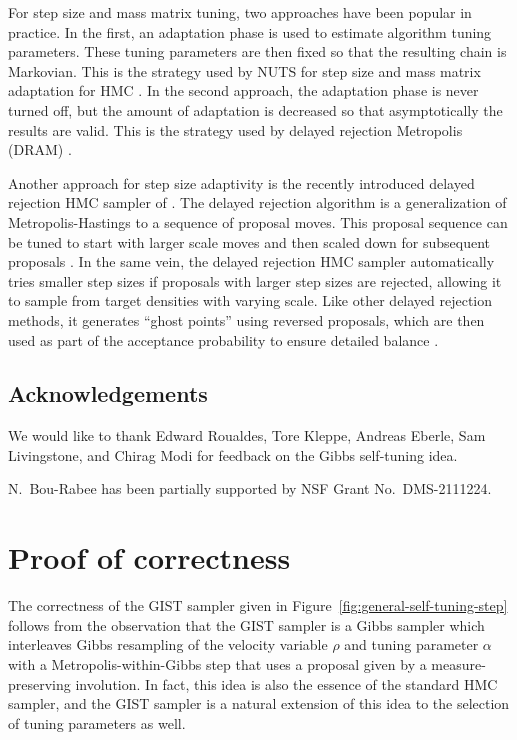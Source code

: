 \documentclass[letterpaper,11pt]{article}
\theoremstyle{plain}%
\theoremstyle{remark}
\begin{document}
For step size and mass matrix tuning, two approaches have been popular in practice. In the first, an adaptation phase is used to estimate algorithm tuning parameters. These tuning parameters are then fixed so that the resulting chain is Markovian. This is the strategy used by NUTS for step size and mass matrix adaptation for HMC \cite{HoGe2014}. In the second approach, the adaptation phase is never turned off, but the amount of adaptation is decreased so that asymptotically the results are valid.  This is the strategy used by delayed rejection Metropolis (DRAM) \cite{haario2006dram}.

Another approach for step size adaptivity is the recently introduced delayed rejection HMC sampler of \cite{modi2023delayed}.  The delayed rejection algorithm \cite{mira2001metropolis,green2001delayed} is a generalization of Metropolis-Hastings to a sequence of proposal moves.  This proposal sequence can be tuned to start with larger scale moves and then scaled down for subsequent proposals \cite{haario2006dram}. In the same vein, the delayed rejection HMC sampler automatically tries smaller step sizes if proposals with larger step sizes are rejected, allowing it to sample from target densities with varying scale. Like other delayed rejection methods, it generates ``ghost points'' using reversed proposals, which are then used as part of the acceptance probability to ensure detailed balance \cite{green2001delayed}.


\subsection*{Acknowledgements}

We would like to thank Edward Roualdes, Tore Kleppe, Andreas Eberle, Sam Livingstone, and Chirag Modi for feedback on the Gibbs self-tuning idea.

N.~Bou-Rabee has been partially supported by NSF Grant No.~DMS-2111224.


\printbibliography

\appendix

\section{Proof of correctness}\label{app:proof_of_correctness}

The correctness of the GIST sampler given in Figure~\ref{fig:general-self-tuning-step}  follows from the observation that the GIST sampler is a Gibbs sampler which interleaves Gibbs resampling of the velocity variable $\rho$ and tuning parameter $\alpha$ with a Metropolis-within-Gibbs step that uses a proposal given by a  measure-preserving involution. In fact, this idea is also the essence of the standard HMC sampler, and the GIST sampler is a natural extension of this idea to the selection of tuning parameters as well.
\end{document}
